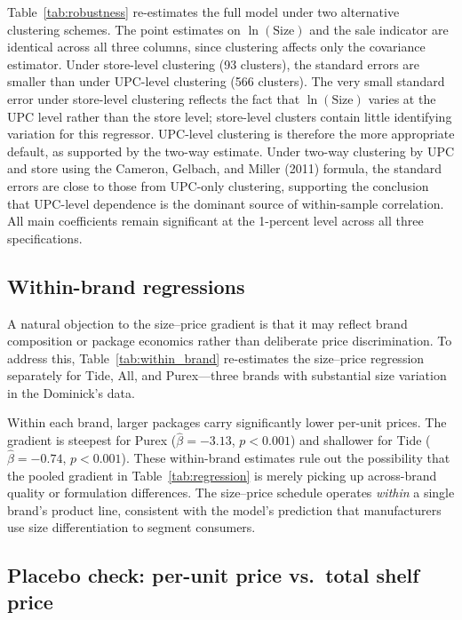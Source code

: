 \documentclass[12pt]{article}
\theoremstyle{definition}
\begin{document}
Table~\ref{tab:robustness} re-estimates the full model under two alternative clustering schemes. The point estimates on $\ln(\text{Size})$ and the sale indicator are identical across all three columns, since clustering affects only the covariance estimator. Under store-level clustering (93 clusters), the standard errors are smaller than under UPC-level clustering (566 clusters). The very small standard error under store-level clustering reflects the fact that $\ln(\text{Size})$ varies at the UPC level rather than the store level; store-level clusters contain little identifying variation for this regressor. UPC-level clustering is therefore the more appropriate default, as supported by the two-way estimate. Under two-way clustering by UPC and store using the Cameron, Gelbach, and Miller (2011) formula, the standard errors are close to those from UPC-only clustering, supporting the conclusion that UPC-level dependence is the dominant source of within-sample correlation. All main coefficients remain significant at the 1-percent level across all three specifications.



\subsection{Within-brand regressions}

A natural objection to the size--price gradient is that it may reflect brand composition or package economics rather than deliberate price discrimination. To address this, Table~\ref{tab:within_brand} re-estimates the size--price regression separately for Tide, All, and Purex---three brands with substantial size variation in the Dominick's data.

Within each brand, larger packages carry significantly lower per-unit prices. The gradient is steepest for Purex ($\hat{\beta} = -3.13$, $p < 0.001$) and shallower for Tide ($\hat{\beta} = -0.74$, $p < 0.001$). These within-brand estimates rule out the possibility that the pooled gradient in Table~\ref{tab:regression} is merely picking up across-brand quality or formulation differences. The size--price schedule operates \textit{within} a single brand's product line, consistent with the model's prediction that manufacturers use size differentiation to segment consumers.



\subsection{Placebo check: per-unit price vs.\ total shelf price}
\end{document}
